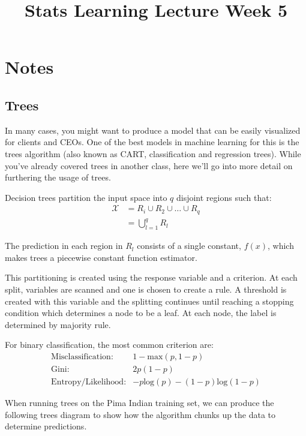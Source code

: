 \documentclass[a4paper]{article}
\title{Stats Learning Lecture Week 5}
\begin{document}
\section{Notes}

\subsection{Trees}

In many cases, you might want to produce a model that can be easily visualized for clients and CEOs. One of the best models in machine learning for this is the trees algorithm (also known as CART, classification and regression trees). While you've already covered trees in another class, here we'll go into more detail on furthering the usage of trees.

Decision trees partition the input space into $q$ disjoint regions such that:
\begin{align}
\mathcal{X}&=R_i\cup R_2\cup\dots\cup R_q\\
&=\bigcup_{l=1}^{q}R_l
\end{align}

The prediction in each region in $R_l$ consists of a single constant, $f(x)$, which makes trees a piecewise constant function estimator.

This partitioning is created using the response variable and a criterion. At each split, variables are scanned and one is chosen to create a rule. A threshold is created with this variable and the splitting continues until reaching a stopping condition which determines a node to be a leaf. At each node, the label is determined by majority rule.

For binary classification, the most common criterion are:
\begin{align*}
\text{Misclassification}: & 1-\text{max}(p,1-p)\\
\text{Gini}: & 2p(1-p)\\
\text{Entropy/Likelihood}: &-p\text{log}(p)-(1-p)\text{log}(1-p)
\end{align*}

When running trees on the Pima Indian training set, we can produce the following trees diagram to show how the algorithm chunks up the data to determine predictions.
\end{document}
